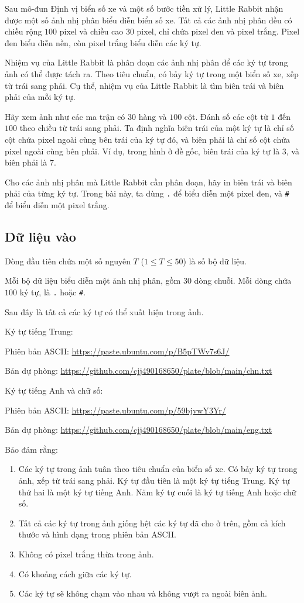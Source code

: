 \documentclass[11pt]{article}
\begin{document}
Sau mô-đun Định vị biển số xe và một số bước tiền xử lý, Little Rabbit nhận
được một số ảnh nhị phân biểu diễn biển số xe. Tất cả các ảnh nhị phân đều có
chiều rộng \(100\) pixel và chiều cao \(30\) pixel, chỉ chứa pixel đen và
pixel trắng. Pixel đen biểu diễn nền, còn pixel trắng biểu diễn các ký tự.

Nhiệm vụ của Little Rabbit là phân đoạn các ảnh nhị phân để các ký tự trong
ảnh có thể được tách ra. Theo tiêu chuẩn, có bảy ký tự trong một biển số xe,
xếp từ trái sang phải. Cụ thể, nhiệm vụ của Little Rabbit là tìm biên trái và
biên phải của mỗi ký tự.

Hãy xem ảnh như các ma trận có \(30\) hàng và \(100\) cột. Đánh số các cột từ
\(1\) đến \(100\) theo chiều từ trái sang phải. Ta định nghĩa biên trái của
một ký tự là chỉ số cột chứa pixel ngoài cùng bên trái của ký tự đó, và biên
phải là chỉ số cột chứa pixel ngoài cùng bên phải. Ví dụ, trong hình ở đề
gốc, biên trái của ký tự là \(3\), và biên phải là \(7\).

Cho các ảnh nhị phân mà Little Rabbit cần phân đoạn, hãy in biên trái và biên
phải của từng ký tự. Trong bài này, ta dùng \texttt{.} để biểu diễn một pixel
đen, và \texttt{\#} để biểu diễn một pixel trắng.

\subsection*{Dữ liệu vào}

Dòng đầu tiên chứa một số nguyên \(T\) (\(1\le T\le 50\)) là số bộ dữ liệu.

Mỗi bộ dữ liệu biểu diễn một ảnh nhị phân, gồm \(30\) dòng chuỗi. Mỗi dòng
chứa \(100\) ký tự, là \texttt{.} hoặc \texttt{\#}.

Sau đây là tất cả các ký tự có thể xuất hiện trong ảnh.

Ký tự tiếng Trung:

Phiên bản ASCII: \url{https://paste.ubuntu.com/p/B5pTWv7s6J/}

Bản dự phòng: \url{https://github.com/cjj490168650/plate/blob/main/chn.txt}

Ký tự tiếng Anh và chữ số:

Phiên bản ASCII: \url{https://paste.ubuntu.com/p/59bjvwY3Yr/}

Bản dự phòng: \url{https://github.com/cjj490168650/plate/blob/main/eng.txt}

Bảo đảm rằng:
\begin{enumerate}
  \item Các ký tự trong ảnh tuân theo tiêu chuẩn của biển số xe. Có bảy ký tự
  trong ảnh, xếp từ trái sang phải. Ký tự đầu tiên là một ký tự tiếng Trung.
  Ký tự thứ hai là một ký tự tiếng Anh. Năm ký tự cuối là ký tự tiếng Anh
  hoặc chữ số.
  \item Tất cả các ký tự trong ảnh giống hệt các ký tự đã cho ở trên, gồm cả
  kích thước và hình dạng trong phiên bản ASCII.
  \item Không có pixel trắng thừa trong ảnh.
  \item Có khoảng cách giữa các ký tự.
  \item Các ký tự sẽ không chạm vào nhau và không vượt ra ngoài biên ảnh.
\end{enumerate}
\end{document}
